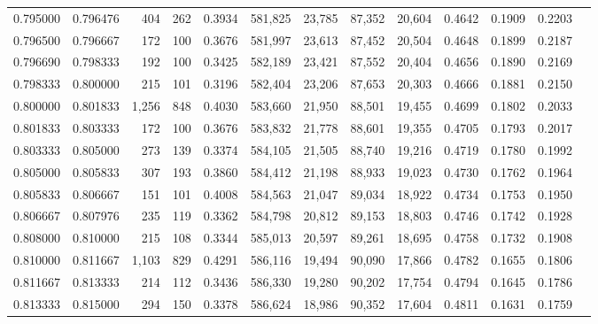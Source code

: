 \begin{tabular}{rrrrrrrrrrrrr}
0.795000 & 0.796476 &   404 & 262 &                                     0.3934 & 581,825 &  23,785 &  87,352 &  20,604 & 0.4642 & 0.1909 & 0.2203 \\
0.796500 & 0.796667 &   172 & 100 &                                     0.3676 & 581,997 &  23,613 &  87,452 &  20,504 & 0.4648 & 0.1899 & 0.2187 \\
0.796690 & 0.798333 &   192 & 100 &                                     0.3425 & 582,189 &  23,421 &  87,552 &  20,404 & 0.4656 & 0.1890 & 0.2169 \\
0.798333 & 0.800000 &   215 & 101 &                                     0.3196 & 582,404 &  23,206 &  87,653 &  20,303 & 0.4666 & 0.1881 & 0.2150 \\
0.800000 & 0.801833 & 1,256 & 848 &                                     0.4030 & 583,660 &  21,950 &  88,501 &  19,455 & 0.4699 & 0.1802 & 0.2033 \\
0.801833 & 0.803333 &   172 & 100 &                                     0.3676 & 583,832 &  21,778 &  88,601 &  19,355 & 0.4705 & 0.1793 & 0.2017 \\
0.803333 & 0.805000 &   273 & 139 &                                     0.3374 & 584,105 &  21,505 &  88,740 &  19,216 & 0.4719 & 0.1780 & 0.1992 \\
0.805000 & 0.805833 &   307 & 193 &                                     0.3860 & 584,412 &  21,198 &  88,933 &  19,023 & 0.4730 & 0.1762 & 0.1964 \\
0.805833 & 0.806667 &   151 & 101 &                                     0.4008 & 584,563 &  21,047 &  89,034 &  18,922 & 0.4734 & 0.1753 & 0.1950 \\
0.806667 & 0.807976 &   235 & 119 &                                     0.3362 & 584,798 &  20,812 &  89,153 &  18,803 & 0.4746 & 0.1742 & 0.1928 \\
0.808000 & 0.810000 &   215 & 108 &                                     0.3344 & 585,013 &  20,597 &  89,261 &  18,695 & 0.4758 & 0.1732 & 0.1908 \\
0.810000 & 0.811667 & 1,103 & 829 &                                     0.4291 & 586,116 &  19,494 &  90,090 &  17,866 & 0.4782 & 0.1655 & 0.1806 \\
0.811667 & 0.813333 &   214 & 112 &                                     0.3436 & 586,330 &  19,280 &  90,202 &  17,754 & 0.4794 & 0.1645 & 0.1786 \\
0.813333 & 0.815000 &   294 & 150 &                                     0.3378 & 586,624 &  18,986 &  90,352 &  17,604 & 0.4811 & 0.1631 & 0.1759 \\

\end{tabular}
